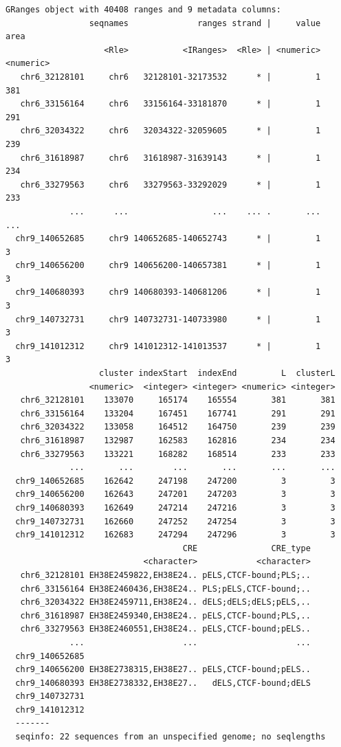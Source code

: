 \documentclass[
]{article}
\begin{document}
\begin{verbatim}
GRanges object with 40408 ranges and 9 metadata columns:
                 seqnames              ranges strand |     value      area
                    <Rle>           <IRanges>  <Rle> | <numeric> <numeric>
   chr6_32128101     chr6   32128101-32173532      * |         1       381
   chr6_33156164     chr6   33156164-33181870      * |         1       291
   chr6_32034322     chr6   32034322-32059605      * |         1       239
   chr6_31618987     chr6   31618987-31639143      * |         1       234
   chr6_33279563     chr6   33279563-33292029      * |         1       233
             ...      ...                 ...    ... .       ...       ...
  chr9_140652685     chr9 140652685-140652743      * |         1         3
  chr9_140656200     chr9 140656200-140657381      * |         1         3
  chr9_140680393     chr9 140680393-140681206      * |         1         3
  chr9_140732731     chr9 140732731-140733980      * |         1         3
  chr9_141012312     chr9 141012312-141013537      * |         1         3
                   cluster indexStart  indexEnd         L  clusterL
                 <numeric>  <integer> <integer> <numeric> <integer>
   chr6_32128101    133070     165174    165554       381       381
   chr6_33156164    133204     167451    167741       291       291
   chr6_32034322    133058     164512    164750       239       239
   chr6_31618987    132987     162583    162816       234       234
   chr6_33279563    133221     168282    168514       233       233
             ...       ...        ...       ...       ...       ...
  chr9_140652685    162642     247198    247200         3         3
  chr9_140656200    162643     247201    247203         3         3
  chr9_140680393    162649     247214    247216         3         3
  chr9_140732731    162660     247252    247254         3         3
  chr9_141012312    162683     247294    247296         3         3
                                    CRE               CRE_type
                            <character>            <character>
   chr6_32128101 EH38E2459822,EH38E24.. pELS,CTCF-bound;PLS;..
   chr6_33156164 EH38E2460436,EH38E24.. PLS;pELS,CTCF-bound;..
   chr6_32034322 EH38E2459711,EH38E24.. dELS;dELS;dELS;pELS,..
   chr6_31618987 EH38E2459340,EH38E24.. pELS,CTCF-bound;PLS,..
   chr6_33279563 EH38E2460551,EH38E24.. pELS,CTCF-bound;pELS..
             ...                    ...                    ...
  chr9_140652685                                              
  chr9_140656200 EH38E2738315,EH38E27.. pELS,CTCF-bound;pELS..
  chr9_140680393 EH38E2738332,EH38E27..   dELS,CTCF-bound;dELS
  chr9_140732731                                              
  chr9_141012312                                              
  -------
  seqinfo: 22 sequences from an unspecified genome; no seqlengths
\end{verbatim}
\end{document}
